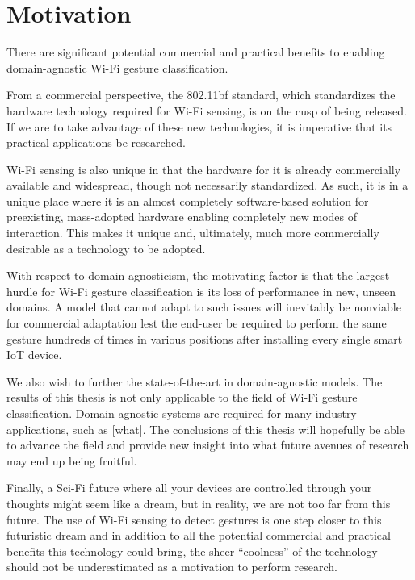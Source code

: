 \section{Motivation}\label{sec:intro-motivation}

There are significant potential commercial and practical benefits to enabling domain-agnostic Wi-Fi gesture classification.

From a commercial perspective, the 802.11bf standard, which standardizes the hardware technology required for Wi-Fi sensing, is on the cusp of being released.
If we are to take advantage of these new technologies, it is imperative that its practical applications be researched. 

Wi-Fi sensing is also unique in that the hardware for it is already commercially available and widespread, though not necessarily standardized.
As such, it is in a unique place where it is an almost completely software-based solution for preexisting, mass-adopted hardware enabling completely new modes of interaction.
This makes it unique and, ultimately, much more commercially desirable as a technology to be adopted.

With respect to domain-agnosticism, the motivating factor is that the largest hurdle for Wi-Fi gesture classification is its loss of performance in new, unseen domains.
A model that cannot adapt to such issues will inevitably be nonviable for commercial adaptation lest the end-user be required to perform the same gesture hundreds of times in various positions after installing every single smart IoT device.

We also wish to further the state-of-the-art in domain-agnostic models.
The results of this thesis is not only applicable to the field of Wi-Fi gesture classification.
Domain-agnostic systems are required for many industry applications, such as [what]. 
The conclusions of this thesis will hopefully be able to advance the field and provide new insight into what future avenues of research may end up being fruitful.

Finally, a Sci-Fi future where all your devices are controlled through your thoughts might seem like a dream, but in reality, we are not too far from this future.
The use of Wi-Fi sensing to detect gestures is one step closer to this futuristic dream and in addition to all the potential commercial and practical benefits this technology could bring, the sheer ``coolness'' of the technology should not be underestimated as a motivation to perform research. 

